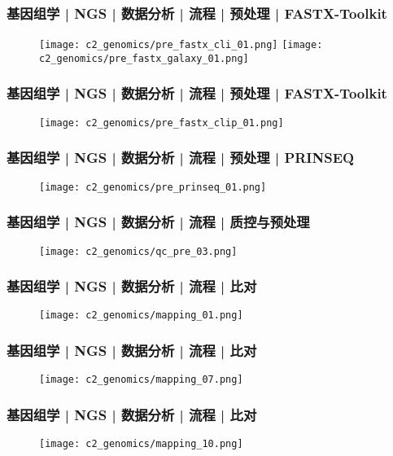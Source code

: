 \begin{frame}
  \frametitle{基因组学 | NGS | 数据分析 | 流程 | 预处理 | FASTX-Toolkit}
  \begin{figure}
    \centering
    \texttt{[image: c2\_genomics/pre\_fastx\_cli\_01.png]}
    \texttt{[image: c2\_genomics/pre\_fastx\_galaxy\_01.png]}
  \end{figure}
\end{frame}

\begin{frame}
  \frametitle{基因组学 | NGS | 数据分析 | 流程 | 预处理 | FASTX-Toolkit}
  \begin{figure}
    \centering
    \texttt{[image: c2\_genomics/pre\_fastx\_clip\_01.png]}
  \end{figure}
\end{frame}

\begin{frame}
  \frametitle{基因组学 | NGS | 数据分析 | 流程 | 预处理 | PRINSEQ}
  \begin{figure}
    \centering
    \texttt{[image: c2\_genomics/pre\_prinseq\_01.png]}
  \end{figure}
\end{frame}

\begin{frame}
  \frametitle{基因组学 | NGS | 数据分析 | 流程 | 质控与预处理}
  \begin{figure}
    \centering
    \texttt{[image: c2\_genomics/qc\_pre\_03.png]}
  \end{figure}
\end{frame}

\begin{frame}
  \frametitle{基因组学 | NGS | 数据分析 | 流程 | 比对}
  \begin{figure}
    \centering
    \texttt{[image: c2\_genomics/mapping\_01.png]}
  \end{figure}
\end{frame}

\begin{frame}
  \frametitle{基因组学 | NGS | 数据分析 | 流程 | 比对}
  \begin{figure}
    \centering
    \texttt{[image: c2\_genomics/mapping\_07.png]}
  \end{figure}
\end{frame}

\begin{frame}
  \frametitle{基因组学 | NGS | 数据分析 | 流程 | 比对}
  \begin{figure}
    \centering
    \texttt{[image: c2\_genomics/mapping\_10.png]}
  \end{figure}
\end{frame}

